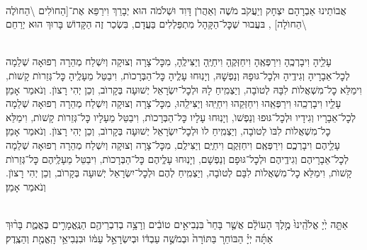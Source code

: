 \documentclass[twoside, openany, parskip=half, 11pt]{book}
\begin{document}
\begin{sometimes}
\\
אֲבוֹתֵינוּ אַבְרָהָם יִצְחָק וְיַעֲקֹב מֹשֶׁה וְאַהֲרֹן דָּוִד וּשְׁלֹמֹה הוּא יְבָרֵךְ וִירַפֵּא אֶת־[הַחוׂלִים \textbackslash הַחוׂלֶה \textbackslash הַחוׂלָה]
,
בּעֲבוּר שְׁכׇּל־הַקָּהָל מִתְפַּלְלִים בַּעֲדָם, בִּשְׂכַר זֶה
הַקָּדוֹשׁ בָּרוּךְ הוּא יְרַחֵם
\setcolumnwidth{1.4in,1.4in,1.4in}
\begin{paracol}{3}
\\
עָלֵָיהָ וִיבָרְכֶֽהָ וִירַפְּאֶֽהָ וִיחַזְּקֶֽהָ וִיחַיֶּֽהָ וְיַצִּילֶֽהָ, מִכׇּל־צָרָה וְצוּקָה וְיִשְׁלַח מְהֵרָה רְפוּאָה שְׁלֵמָה לְכׇל־אֵבָרָיהָ וְגִידֶֽיהָ וּלְכׇל־גּוּפָהּ וְנַפְשׇׁהּ, וְיָנֽוּחוּ עָלְֶיהָ כׇּל־הַבְּרָכוׂת, וִיבַטֵּל מֵעָלֶֽיהָ כׇּל־גְּזֵרוׂת קָשׁוׂת, וִימַלֵּא כׇל־מִשְׁאֲלוׂת לִבָּהּ לְטוׂבָה, וְיַצְמִֽיחַ לָהּ וּלְכׇל־יִשְׂרָאֵל יְשׁוּעָה בְּקָרוׂב, וְכֵן יְהִי רָצוׂן. וְנֹאמַר אָמֵן׃
\switchcolumn
{}\\
עָלֵָיו וִיבָרְכֵֽהוּ וִירַפְּאֵֽהוּ וִיחַזְּקֵהוּ וִיחַיֵּֽהוּ וְיַצִּילֵֽהוּ, מִכׇּל־צָרָה וְצוּקָה וְיִשְׁלַח מְהֵרָה רְפוּאָה שְׁלֵמָה לְכׇל־אֵבָרָיו וְגִידָיו וּלְכׇל־גּוּפוּ וְנַפְשׁוׂ, וְיָנֽוּחוּ עָלָיו כׇּל־הַבְּרָכוׂת, וִיבַטֵּל מֵעָלָיו כׇּל־גְּזֵרוׂת קָשׁוׂת, וִימַלֵּא כׇל־מִשְׁאֲלוׂת לִבּוׂ לְטוׂבָה, וְיַצְמִֽיחַ לוׂ וּלְכׇל־יִשְׂרָאֵל יְשׁוּעָה בְּקָרוׂב, וְכֵן יְהִי רָצוׂן. וְנֹאמַר אָמֵן׃
\switchcolumn
{}\\
עָלֵָיהֶם וִיבָרְכְֶם וִירַפְּאֶֽם וִיחַזְּקֶֽם וִיחַיֶּֽם וְיַצִּילֶֽם, מִכׇּל־צָרָה וְצוּקָה וְיִשְׁלַח מְהֵרָה רְפוּאָה שְׁלֵמָה לְכׇל־אֵבָרָיהֶם וְגִידֶֽיהֶם וּלְכׇל־גּוּפָם וְנַפְשָׁם, וְיָנֽוּחוּ עָלְֶיהֶם כׇּל־הַבְּרָכוׂת, וִיבַטֵּל מֵעָלֶֽיהֶם כׇּל־גְּזֵרוׂת קָשׁוׂת, וִימַלֵּא כׇל־מִשְׁאֲלוׂת לִבָּם לְטוׂבָה, וְיַצְמִֽיחַ לְהֶם וּלְכׇל־יִשְׂרָאֵל יְשׁוּעָה בְּקָרוׂב, וְכֵן יְהִי רָצוׂן. וְנֹאמַר אָמֵן׃
\end{paracol}

\end{sometimes}

\halfkaddish

\hagbaha
\newpage
{}

\\
אַתָּ֤ה יְ֙יָ אֱלֹ֙הֵֽינוּ֙ מֶ֣לֶךְ הָעוֹלָ֔ם אֲשֶׁ֤ר בָּחַר֙ בִּנְבִיאִ֣ים טוֹבִ֔ים וְרָצָ֥ה בְדִבְרֵיהֶ֖ם הַנֶּֽאֱמָרִ֣ים בֶּאֱמֶ֑ת בָּר֨וּךְ אַתָּ֜ה יְיָ֗ הַבּוֹחֵר֚ בַּתּוֹרָה֙ וּבְמֹשֶׁ֣ה עַבְדּ֔וֹ וּבְיִשְׂרָאֵ֣ל עַמּ֔וֹ וּבִנְבִיאֵ֥י הָֽאֱמֶ֖ת וְהַצֶֽדֶק׃
\end{document}
